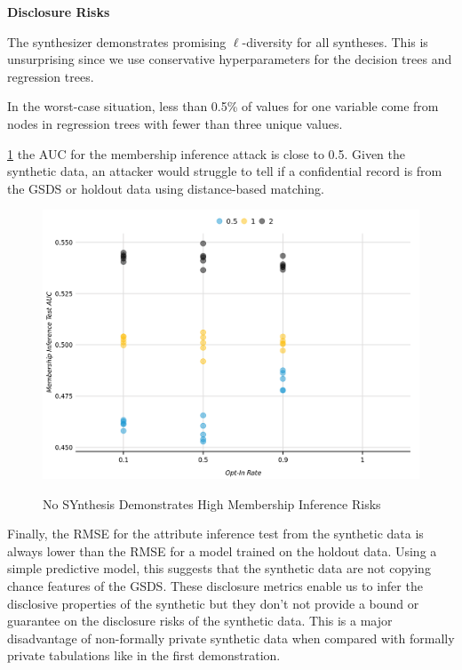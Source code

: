 \documentclass[
]{urban-formatting}
\begin{document}
\textbf{Disclosure Risks}

The synthesizer demonstrates promising \(\ell\)-diversity for all
syntheses. This is unsurprising since we use conservative
hyperparameters for the decision trees and regression trees.

In the worst-case situation, less than 0.5\% of values for one variable
come from nodes in regression trees with fewer than three unique values.

\ref{fig:membership} the AUC for the membership inference attack is
close to 0.5. Given the synthetic data, an attacker would struggle to
tell if a confidential record is from the GSDS or holdout data using
distance-based matching.

\begin{figure}[!htb]
    \caption{No SYnthesis Demonstrates High Membership Inference Risks}
    \centering
    \includegraphics[width=6.5in]{../analysis/figures/membership-inference-1.png}
    \label{fig:membership}
\end{figure}

Finally, the RMSE for the attribute inference test from the synthetic
data is always lower than the RMSE for a model trained on the holdout
data. Using a simple predictive model, this suggests that the synthetic
data are not copying chance features of the GSDS. These disclosure
metrics enable us to infer the disclosive properties of the synthetic
but they don't not provide a bound or guarantee on the disclosure risks
of the synthetic data. This is a major disadvantage of non-formally
private synthetic data when compared with formally private tabulations
like in the first demonstration.
\end{document}
